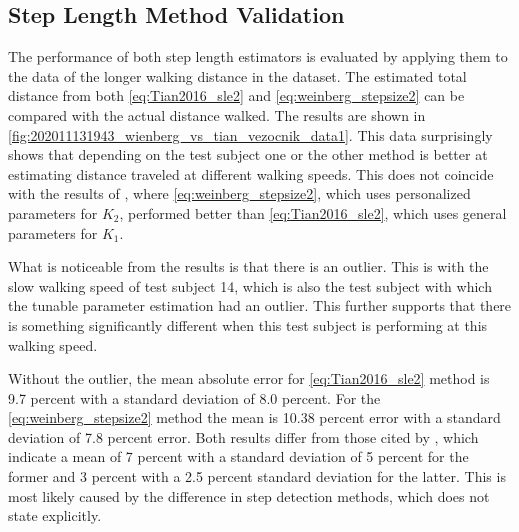 \subsection{Step Length Method Validation}
\label{sec:results-step_length-validation}
The performance of both step length estimators is evaluated by applying them to the data of the longer walking distance in the \citet{Vezocnik2019} dataset. The estimated total distance from both \eqref{eq:Tian2016_sle2} and \eqref{eq:weinberg_stepsize2} can be compared with the actual distance walked. The results are shown in  \cref{fig:202011131943_wienberg_vs_tian_vezocnik_data1}. This data surprisingly shows that depending on the test subject one or the other method is better at estimating distance traveled at different walking speeds. This does not coincide with the results of \cite{Vezocnik2019}, where \eqref{eq:weinberg_stepsize2}, which uses personalized parameters for $ K_2 $, performed better than \eqref{eq:Tian2016_sle2}, which uses general parameters for $ K_1 $. \par 

What is noticeable from the results is that there is an outlier. This is with the slow walking speed of test subject 14, which is also the test subject with which the tunable parameter estimation had an outlier. This further supports that there is something significantly different when this test subject is performing at this walking speed.\par 

 Without the outlier, the mean absolute error for \eqref{eq:Tian2016_sle2} method is 9.7 percent with a standard deviation of 8.0 percent. For the \eqref{eq:weinberg_stepsize2} method the mean is 10.38 percent error with a standard deviation of 7.8 percent error. Both results differ from those cited by \cite{Vezocnik2019}, which indicate a mean of 7 percent with a standard deviation of 5 percent for the former and 3 percent with a 2.5 percent standard deviation for the latter.
 This is most likely caused by the difference in step detection methods, which \cite{Vezocnik2019} does not state explicitly.

